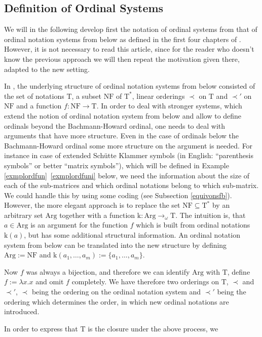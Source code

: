\documentclass[10pt]{article}
\def \refcom#1#2{\ref{#1}\ \ref{#1#2}}%
\def\ar{\rightarrow}
\def\Arg{\mathrm{Arg}}
\def\k{\mathrm{k}}
\def\NF{\mathrm{NF}}
\def\T{\mathrm{T}}
\begin{document}
\subsection{Definition of Ordinal Systems}
We will in the following develop first the notation of ordinal systems
from that of ordinal notation systems from below as defined
in the first four chapters of \cite{setzvenedig}. However, it is
not necessary to read this article, since for the reader who doesn't know the
previous approach we will then
repeat the motivation given there, adapted to the new
setting.\par 
In \cite{setzvenedig}, the underlying structure of ordinal notation
systems from below consisted of the set of notations $\T$, a subset
$\NF$ of $\T^\ast$, linear orderings $\prec$ on $\T$ and $\prec '$ on
$\NF$ and a function $f: \NF \ar \T$. In order to deal with stronger
systems, which extend the notion of ordinal notation system from below
and allow to define ordinals beyond the Bachmann-Howard ordinal, one needs
to deal with arguments that have more structure. Even in the
case of ordinals below the Bachmann-Howard ordinal some more
structure on the argument is needed. For instance 
in case of extended Sch{\"u}tte Klammer symbols (in English:
``parenthesis symbols'' or  better ``matrix symbols''), which 
will be defined in Example \refcom{exmplordfun}i below,
we need the information about the size of each of the sub-matrices and
which ordinal notations belong to which sub-matrix. We could handle
this by using some coding (see Subsection \ref{equivonsfb}).
However, the more elegant
approach is to replace the set $\NF \subseteq \T^\ast$ by an
arbitrary set $\Arg$ together with a function $\k: \Arg \ar_\omega \T$.
The intuition is, that $a \in \Arg$ is an argument for the function
$f$ which is built from ordinal notations $\k(a)$, but has some
additional structural information. An ordinal notation system from 
below can be translated into the new structure by defining
$\Arg:= \NF$ and $\k(a_1 ,\ldots, a_m):= \{ a_1 ,\ldots, a_m \}$.\par 
Now $f$ was  always a bijection, and therefore 
we can identify $\Arg$ with $\T$, define $f:= \lambda x.x$ and
omit $f$ completely. We have  therefore 
two orderings on $\T$, $\prec$ and  $\prec '$,
$\prec$ being the ordering on the ordinal notation system and 
$\prec '$ being the ordering which determines the  order, in which new
ordinal notations are introduced.\par 
In order to express that $\T$ is the closure under the above process, we
\end{document}
